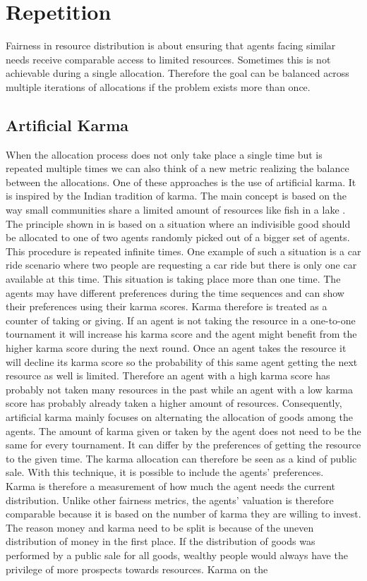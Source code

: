 \documentclass[german, a4paper, 11pt, oneside]{scrbook}
\begin{document}
\section{Repetition}
Fairness in resource distribution is about ensuring that agents facing similar needs receive comparable access to limited resources. Sometimes this is not achievable during a single allocation. Therefore the goal can be balanced across multiple iterations of allocations if the problem exists more than once. \cite{Elokda.2023}
\subsection{Artificial Karma}
When the allocation process does not only take place a single time but is repeated multiple times we can also think of a new metric realizing the balance between the allocations. One of these approaches is the use of artificial karma. It is inspired by the Indian tradition of karma. The main concept is based on the way small communities share a limited amount of resources like fish in a lake \cite{Berkes}. \\The principle shown in \cite{Elokda.2023} is based on a situation where an indivisible good should be allocated to one of two agents randomly picked out of a bigger set of agents. This procedure is repeated infinite times. One example of such a situation is a car ride scenario where two people are requesting a car ride but there is only one car available at this time. This situation is taking place more than one time. The agents may have different preferences during the time sequences and can show their preferences using their karma scores. Karma therefore is treated as a counter of taking or giving. If an agent is not taking the resource in a one-to-one tournament it will increase his karma score and the agent might benefit from the higher karma score during the next round. Once an agent takes the resource it will decline its karma score so the probability of this same agent getting the next resource as well is limited. Therefore an agent with a high karma score has probably not taken many resources in the past while an agent with a low karma score has probably already taken a higher amount of resources. Consequently, artificial karma mainly focuses on alternating the allocation of goods among the agents.  The amount of karma given or taken by the agent does not need to be the same for every tournament. It can differ by the preferences of getting the resource to the given time. The karma allocation can therefore be seen as a kind of public sale. With this technique, it is possible to include the agents' preferences.  \cite{Elokda.2023} \\Karma is therefore a measurement of how much the agent needs the current distribution. Unlike other fairness metrics, the agents' valuation is therefore comparable because it is based on the number of karma they are willing to invest. \\The reason money and karma need to be split is because of the uneven distribution of money in the first place. If the distribution of goods was performed by a public sale for all goods, wealthy people would always have the privilege of more prospects towards resources. Karma on the 
\end{document}
